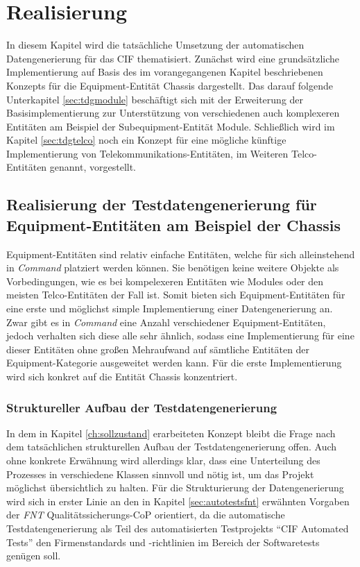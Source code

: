 \chapter{Realisierung}\label{ch:realisierung}
In diesem Kapitel wird die tatsächliche Umsetzung der automatischen Datengenerierung für das \ac{CIF} thematisiert. Zunächst wird eine grundsätzliche Implementierung auf Basis des im vorangegangenen Kapitel beschriebenen Konzepts für die Equipment-Entität Chassis dargestellt. Das darauf folgende Unterkapitel \ref{sec:tdgmodule} beschäftigt sich mit der Erweiterung der Basisimplementierung zur Unterstützung von verschiedenen auch komplexeren Entitäten am Beispiel der Subequipment-Entität Module. Schließlich wird im Kapitel \ref{sec:tdgtelco} noch ein Konzept für eine mögliche künftige Implementierung von Telekommunikations-Entitäten, im Weiteren Telco-Entitäten genannt, vorgestellt.

\section{Realisierung der Testdatengenerierung für Equipment-Entitäten am Beispiel der Chassis}\label{sec:tdgchassis}
Equipment-Entitäten sind relativ einfache Entitäten, welche für sich alleinstehend in \textit{Command} platziert werden können. Sie benötigen keine weitere Objekte als Vorbedingungen, wie es bei kompelexeren Entitäten wie Modules oder den meisten Telco-Entitäten der Fall ist. Somit bieten sich Equipment-Entitäten für eine erste und möglichst simple Implementierung einer Datengenerierung an. Zwar gibt es in \textit{Command} eine Anzahl verschiedener Equipment-Entitäten, jedoch verhalten sich diese alle sehr ähnlich, sodass eine Implementierung für eine dieser Entitäten ohne großen Mehraufwand auf sämtliche Entitäten der Equipment-Kategorie ausgeweitet werden kann. Für die erste Implementierung wird sich konkret auf die Entität Chassis konzentriert.

\subsection{Struktureller Aufbau der Testdatengenerierung}\label{subsec:tdgStruktur}
In dem in Kapitel \ref{ch:sollzustand} erarbeiteten Konzept bleibt die Frage nach dem tatsächlichen strukturellen Aufbau der Testdatengenerierung offen. Auch ohne konkrete Erwähnung wird allerdings klar, dass eine Unterteilung des Prozesses in verschiedene Klassen sinnvoll und nötig ist, um das Projekt möglichst übersichtlich zu halten. Für die Strukturierung der Datengenerierung wird sich in erster Linie an den in Kapitel \ref{sec:autotestsfnt} erwähnten Vorgaben der \textit{FNT} Qualitätssicherungs-\ac{CoP} orientiert, da die automatische Testdatengenerierung als Teil des automatisierten Testprojekts \enquote{CIF Automated Tests} den Firmenstandards und -richtlinien im Bereich der Softwaretests genügen soll.


